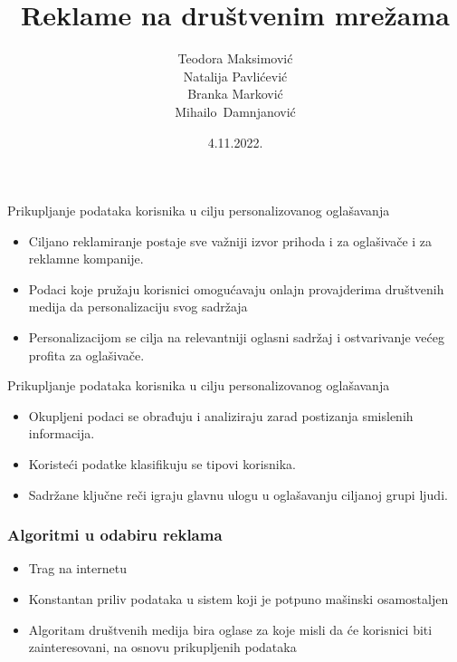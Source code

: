\documentclass{beamer}
\title{Reklame na društvenim mrežama}
\author[Maksimović,Pavlićević,Marković,Damnjanović  ]{Teodora Maksimović\\Natalija Pavlićević\\
	Branka Marković\\Mihailo~Damnjanović}
\institute[]{Matematički fakultet, Univerzitet u Beogradu}
\date{4.11.2022.}
\begin{document}
	
	\frame{\titlepage}
	
	\begin{frame}{Prikupljanje podataka korisnika u cilju personalizovanog oglašavanja}
		\begin{itemize}
			\item Ciljano reklamiranje postaje sve važniji izvor prihoda i za oglašivače i za reklamne kompanije.
			\item Podaci koje pružaju korisnici omogućavaju onlajn provajderima društvenih medija da personalizaciju svog sadržaja
			\item Personalizacijom se cilja na relevantniji oglasni sadržaj i ostvarivanje većeg profita za oglašivače.
		\end{itemize}
	\end{frame}
	
	\begin{frame}{Prikupljanje podataka korisnika u cilju personalizovanog oglašavanja}
		\begin{itemize}
			\item Okupljeni podaci se obrađuju i analiziraju zarad postizanja smislenih informacija.
			\item Koristeći podatke klasifikuju se tipovi korisnika. \item Sadržane ključne reči igraju glavnu ulogu u oglašavanju ciljanoj grupi ljudi.
		\end{itemize}
		
	\end{frame}
	
	\begin{frame}
		\frametitle{Algoritmi u odabiru reklama}
		\begin{itemize}
			\item Trag na internetu
			\item Konstantan priliv podataka u sistem koji je potpuno mašinski osamostaljen
			\item Algoritam društvenih medija bira oglase za koje misli da će korisnici biti zainteresovani, na osnovu prikupljenih podataka
		\end{itemize} 
	\end{frame}
	
\end{document}
